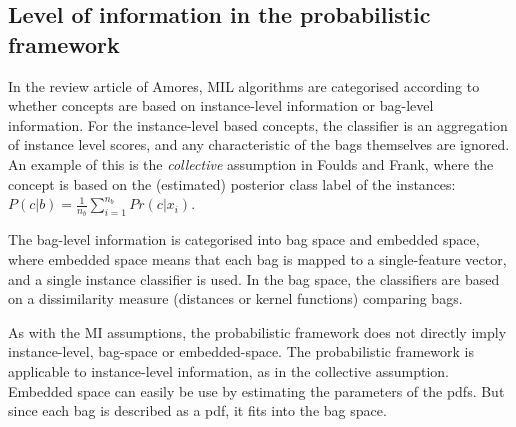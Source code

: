 \subsection{Level of information in the probabilistic framework}
In the review article of Amores, MIL algorithms are categorised according to whether concepts are based on instance-level information or bag-level information. 
For the instance-level based concepts, the classifier is an aggregation of instance level scores, and any characteristic of the bags themselves are ignored. 
An example of this is the {\it collective} assumption in Foulds and Frank, where the concept is based on the (estimated) posterior class label of the instances: $P(c|b) = \frac{1}{n_b} \sum_{i = 1}^{n_b} Pr(c|x_i)$. 

The bag-level information is categorised into bag space and embedded space, where embedded space means that each bag is mapped to a single-feature vector, and a single instance classifier is used. 
In the bag space, the classifiers are based on a dissimilarity measure (distances or kernel functions) comparing bags.

As with the MI assumptions, the probabilistic framework does not directly imply instance-level, bag-space or embedded-space. 
The probabilistic framework is applicable to instance-level information, as in the collective assumption. 
Embedded space can easily be use by estimating the parameters of the pdfs. 
But since each bag is described as a pdf, it fits into the bag space. 

